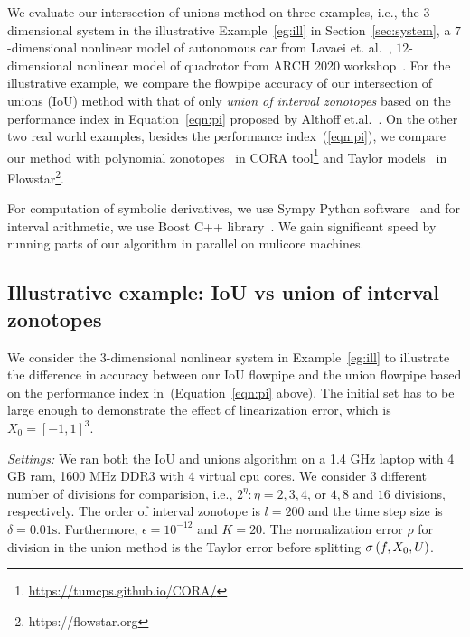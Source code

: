 We evaluate our intersection of unions method on three examples, i.e.,
the $3$-dimensional system in the illustrative Example~\ref{eg:ill} in
Section~\ref{sec:system}, a $7$-dimensional nonlinear model of autonomous car
from Lavaei et. al.~\cite{lavaei2020formal}, $12$-dimensional
nonlinear model of quadrotor from ARCH 2020
workshop~\cite{geretti2020arch}.  For the illustrative example, we
compare the flowpipe accuracy of our intersection of unions (IoU)
method with that of only
\emph{union of interval zonotopes} based on the performance index in
Equation~\ref{eqn:pi} proposed by Althoff
et.al.~\cite{althoff2008reachability}.  
On the other two real world
examples, besides the performance index~(\ref{eqn:pi}), we compare our
method with polynomial
zonotopes~\cite{althoff2013reachability} in CORA
tool\footnote{\url{https://tumcps.github.io/CORA/}} and Taylor
models~\cite{chen2012taylor} in
Flowstar\footnote{https://flowstar.org}.


For computation of symbolic derivatives, we use Sympy Python
software~\cite{10.7717/peerj-cs.103} and for interval arithmetic, we
use Boost C++ library~\cite{bronnimann2006design}.  We gain
significant speed by running parts of our algorithm in
parallel on mulicore machines.

\subsection{Illustrative example: IoU  vs union of interval zonotopes}
We consider the 3-dimensional nonlinear system in Example~\ref{eg:ill}
to illustrate the difference in accuracy between our IoU flowpipe and
the union flowpipe based on the performance index
in~\cite{althoff2008reachability}(Equation~\ref{eqn:pi} above).  The
initial set has to be large enough to demonstrate the effect of linearization error, which is $X_0 = [-1,1]^3$.

\emph{Settings:}  We ran both the IoU and unions algorithm on a 1.4 GHz
laptop with 4 GB ram, 1600 MHz DDR3 with 4 virtual cpu cores.
We consider $3$ different number of divisions for comparision, i.e.,
$2^\eta:\eta = 2, 3,4$, or $4, 8$ and $16$ divisions,
respectively. The order of interval zonotope is $l = 200$ and the time
step size is $\delta = 0.01\si{\second}$.  Furthermore, $\epsilon = 10^{-12}$
and $K = 20$.  The normalization error $\rho$ for division in the union method is
the Taylor error before splitting $\sigma\left(f,X_0,U\right)$.

